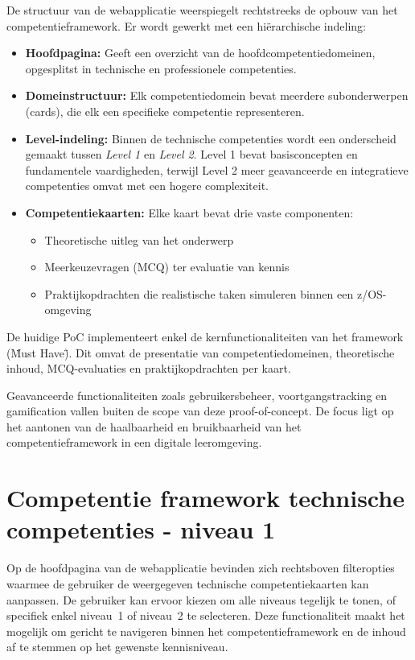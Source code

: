 De structuur van de webapplicatie weerspiegelt rechtstreeks de opbouw van het competentieframework. Er wordt gewerkt met een hiërarchische indeling:

\begin{itemize}
	\item \textbf{Hoofdpagina:} Geeft een overzicht van de hoofdcompetentiedomeinen, opgesplitst in technische en professionele competenties.
	
	\item \textbf{Domeinstructuur:} Elk competentiedomein bevat meerdere subonderwerpen (cards), die elk een specifieke competentie representeren.
	
	\item \textbf{Level-indeling:} Binnen de technische competenties wordt een onderscheid gemaakt tussen \textit{Level 1} en \textit{Level 2}. Level 1 bevat basisconcepten en fundamentele vaardigheden, terwijl Level 2 meer geavanceerde en integratieve competenties omvat met een hogere complexiteit.
	
	\item \textbf{Competentiekaarten:} Elke kaart bevat drie vaste componenten:
	\begin{itemize}
		\item Theoretische uitleg van het onderwerp
		\item Meerkeuzevragen (MCQ) ter evaluatie van kennis
		\item Praktijkopdrachten die realistische taken simuleren binnen een z/OS-omgeving
	\end{itemize}
\end{itemize}

De huidige PoC implementeert enkel de kernfunctionaliteiten van het framework (\"Must Have\"). Dit omvat de presentatie van competentiedomeinen, theoretische inhoud, MCQ-evaluaties en praktijkopdrachten per kaart.

Geavanceerde functionaliteiten zoals gebruikersbeheer, voortgangstracking en gamification vallen buiten de scope van deze proof-of-concept. De focus ligt op het aantonen van de haalbaarheid en bruikbaarheid van het competentieframework in een digitale leeromgeving.

\section{Competentie framework technische competenties - niveau 1}

Op de hoofdpagina van de webapplicatie bevinden zich rechtsboven filteropties waarmee de gebruiker de weergegeven technische competentiekaarten kan aanpassen. 
De gebruiker kan ervoor kiezen om alle niveaus tegelijk te tonen, of specifiek enkel niveau~1 of niveau~2 te selecteren. 
Deze functionaliteit maakt het mogelijk om gericht te navigeren binnen het competentieframework en de inhoud af te stemmen op het gewenste kennisniveau.


